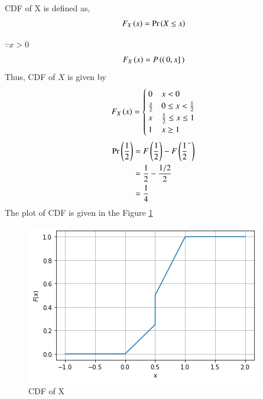 

CDF of X is defined as,
\begin{align}
    F_X\left(x\right)=\Pr\left(X \le x\right)
\end{align}

$\because x > 0$
\begin{align}
    F_X\left(x\right)=P\left((\,0,x]\,\right)
\end{align}
Thus, CDF of $X$ is given by
\begin{align}
    F_X\left(x\right) =
    \begin{cases}
    0 & x < 0\\
    \frac{x}{2} & 0 \le x < \frac{1}{2}\\
     x & \frac{1}{2} \le x \le 1\\
     1 & x\geq 1
    \end{cases}
\end{align}
\begin{align}
    \Pr\left(\frac{1}{2}\right) & = F\left(\frac{1}{2}\right) - F\left(\frac{1}{2}^{-}\right)\\
    & = \frac{1}{2} - \frac{1/2}{2}\\
    & = \frac{1}{4}
\end{align}
The plot of CDF is given in the Figure \ref{ma2015-27:fig:cdf}

\begin{figure}[h!]
\centering
\includegraphics[width=\columnwidth]{solutions/adv/ma/2015/27/Figure/fig4.png}
\caption{CDF of X}
\label{ma2015-27:fig:cdf}
\end{figure}

   


